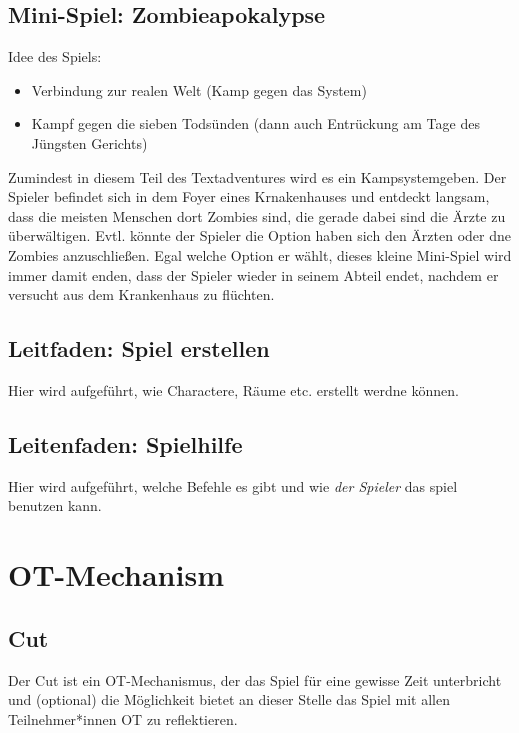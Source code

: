 \documentclass[a4paper, 12pt]{scrartcl}
\begin{document}
    \subsection{Mini-Spiel: Zombieapokalypse} \label{zombieapokalypse}
    Idee des Spiels:
    \begin{itemize}
    \item Verbindung zur realen Welt (Kamp gegen das System)
    \item Kampf gegen die sieben Todsünden (dann auch Entrückung am Tage des Jüngsten Gerichts)
    \end{itemize}
    Zumindest in diesem Teil des Textadventures wird es ein Kampsystemgeben. 
    Der Spieler befindet sich in dem Foyer eines Krnakenhauses und entdeckt langsam, dass die meisten Menschen dort Zombies sind, die gerade dabei sind die Ärzte zu überwältigen. 
    Evtl. könnte der Spieler die Option haben sich den Ärzten oder dne Zombies anzuschließen.
    Egal welche Option er wählt, dieses kleine Mini-Spiel wird immer damit enden, dass der Spieler wieder in seinem Abteil endet, nachdem er versucht aus dem Krankenhaus zu flüchten.
    
    \subsection{Leitfaden: Spiel erstellen}
    Hier wird aufgeführt, wie Charactere, Räume etc. erstellt werdne können.
    
    \subsection{Leitenfaden: Spielhilfe}
    Hier wird aufgeführt, welche Befehle es gibt und wie \textit{der Spieler} das spiel benutzen kann.
    

    \section{OT-Mechanism}
    \subsection{Cut} \label{cut}
    Der Cut ist ein OT-Mechanismus, der das Spiel für eine gewisse Zeit unterbricht und (optional) die Möglichkeit bietet an dieser Stelle das Spiel mit allen Teilnehmer*innen OT zu reflektieren. 
\end{document}
